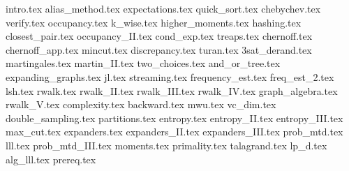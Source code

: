            {intro.tex}
   {alias_method.tex}
     {expectations.tex}
      {quick_sort.tex}
       {chebychev.tex}
          {verify.tex}
       {occupancy.tex}
          {k_wise.tex}
  {higher_moments.tex}
         {hashing.tex}
    {closest_pair.tex}
    {occupancy_II.tex}
        {cond_exp.tex}
          {treaps.tex}
        {chernoff.tex}
    {chernoff_app.tex}
         {mincut.tex}
     {discrepancy.tex}
           {turan.tex}
 {3sat_derand.tex}
     {martingales.tex}
  {martin_II.tex}
     {two_choices.tex}
          {and_or_tree.tex}
 {expanding_graphs.tex}
              {jl.tex}
       {streaming.tex}
   {frequency_est.tex}
      {freq_est_2.tex}
             {lsh.tex}
           {rwalk.tex}
        {rwalk_II.tex}
       {rwalk_III.tex}
        {rwalk_IV.tex}
   {graph_algebra.tex}
         {rwalk_V.tex}
 {complexity.tex}
        {backward.tex}
             {mwu.tex}
              {vc_dim.tex}
 {double_sampling.tex}
      {partitions.tex}
         {entropy.tex}
      {entropy_II.tex}
     {entropy_III.tex}
         {max_cut.tex}
       {expanders.tex}
    {expanders_II.tex}
   {expanders_III.tex}
        {prob_mtd.tex}
     {lll.tex}
     {prob_mtd_III.tex}
      {moments.tex}
       {primality.tex}
       {talagrand.tex}
            {lp_d.tex}
         {alg_lll.tex}
          {prereq.tex}


